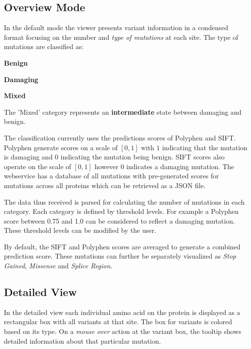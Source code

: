 \documentclass[twoside]{article}
\begin{document}
\begin{multicols}{2}
\subsection{Overview Mode}
In the default mode the viewer presents variant information in a condensed format focusing on the number and \textit{type of mutations} at each site. The type of mutations are classified as:
\begin{compactitem}
\item \textbf{Benign} %
\item \textbf{Damaging} %
\item \textbf{Mixed}
\end{compactitem}

The 'Mixed' category represents an \textbf{intermediate} state between damaging and benign.


The classification currently uses the predictions scores of Polyphen\cite{Ramensky2002} and SIFT\cite{Kumar2009}. Polyphen generate scores on a scale of $[0,1]$ with $1$ indicating that the mutation is damaging and $0$ indicating the mutation being benign. SIFT scores also operate on the scale of $[0,1]$ however $0$ indicates a damaging mutation.
The webservice has a database of all mutations with pre-generated scores for mutations across all proteins which can be retrieved as a JSON file.

The data thus received is parsed for calculating the number of mutations in each category. Each category is defined by threshold levels. For example a Polyphen score between 0.75 and 1.0 can be considered to reflect a damaging mutation. These threshold levels can be modified by the user.

By default, the SIFT and Polyphen scores are averaged to generate a combined prediction score. These mutations can further be separately visualized as \textit{Stop Gained}, \textit{Missense} and \textit{Splice Region}.


\subsection{Detailed View}
In the detailed view each individual amino acid on the protein is displayed as a rectangular box with all variants at that site. The box for variants is colored based on its type. On a \textit{mouse over} action at the variant box, the tooltip shows detailed information about that particular mutation.




\end{multicols}
\end{document}
